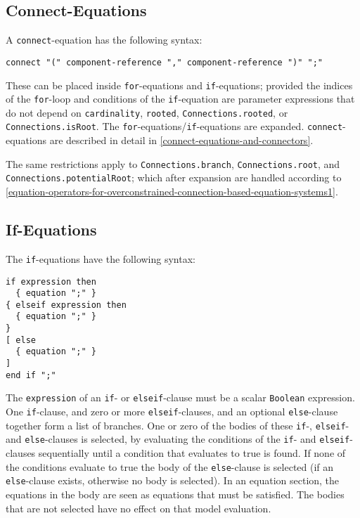 \subsection{Connect-Equations}\label{connect-equations}

A \lstinline!connect!-equation has the following syntax:
\begin{lstlisting}[language=grammar]
connect "(" component-reference "," component-reference ")" ";"
\end{lstlisting}

These can be placed inside \lstinline!for!-equations and \lstinline!if!-equations; provided the indices of the \lstinline!for!-loop and conditions of the \lstinline!if!-equation are parameter expressions that do not depend on \lstinline!cardinality!, \lstinline!rooted!, \lstinline!Connections.rooted!, or \lstinline!Connections.isRoot!.
The \lstinline!for!-equations/\lstinline!if!-equations are expanded.
\lstinline!connect!-equations are described in detail in \cref{connect-equations-and-connectors}.

The same restrictions apply to \lstinline!Connections.branch!, \lstinline!Connections.root!, and \lstinline!Connections.potentialRoot!; which after expansion are handled according to \cref{equation-operators-for-overconstrained-connection-based-equation-systems1}.

\subsection{If-Equations}\label{if-equations}

The \lstinline!if!-equations have the following syntax:
\begin{lstlisting}[language=grammar]
if expression then
  { equation ";" }
{ elseif expression then
  { equation ";" }
}
[ else
  { equation ";" }
]
end if ";"
\end{lstlisting}

The \lstinline!expression! of an \lstinline!if!- or \lstinline!elseif!-clause must be a scalar \lstinline!Boolean! expression.
One \lstinline!if!-clause, and zero or more \lstinline!elseif!-clauses, and an optional \lstinline!else!-clause together form a list of branches.
One or zero of the bodies of these \lstinline!if!-, \lstinline!elseif!- and \lstinline!else!-clauses is selected, by evaluating the conditions of the \lstinline!if!- and \lstinline!elseif!-clauses sequentially until a condition that evaluates to true is found.
If none of the conditions evaluate to true the body of the \lstinline!else!-clause is selected (if an \lstinline!else!-clause exists, otherwise no body is selected).
In an equation section, the equations in the body are seen as equations that must be satisfied.
The bodies that are not selected have no effect on that model evaluation.

